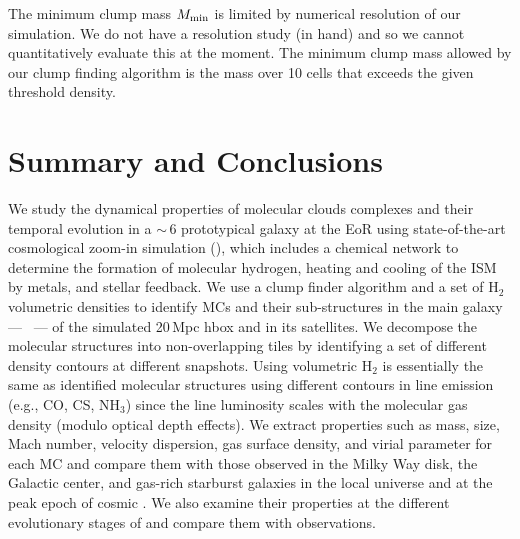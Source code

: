 \documentclass[iop]{emulateapj}
\begin{document}
The minimum clump mass $M_{\rm min}$ is limited by numerical resolution of our simulation. We do not have a resolution study (in hand) and so we cannot quantitatively evaluate this at the moment. The minimum clump mass allowed
by our clump finding algorithm is the mass over 10 cells that exceeds the given threshold density.



\section{Summary and Conclusions}      \label{sec:conclusion}

We study the dynamical properties of molecular clouds complexes and their temporal evolution in a \z$\sim$\,6 prototypical galaxy 
at the EoR using state-of-the-art cosmological zoom-in simulation (),
which includes a chemical network to determine the formation of molecular
hydrogen, heating and cooling of the ISM by metals, and stellar feedback.
We use a clump finder algorithm and a set of H$_2$ volumetric densities
to identify MCs and their sub-structures in the main galaxy --- \flower\ --- of the
simulated 20\,Mpc h\pmOne box and in its satellites.
We decompose the molecular structures into non-overlapping tiles
by identifying a set of different density contours at different snapshots.
Using volumetric H$_2$ is essentially the same as identified molecular structures using
different contours in line emission (e.g., CO, CS, NH$_3$)
since the line luminosity scales with the molecular gas density (modulo optical depth effects).
We extract properties such as mass, size, Mach number, velocity dispersion, gas surface density, and virial parameter for each MC and 
compare them with those observed in the Milky Way disk, the Galactic center,
and gas-rich starburst galaxies in the local universe and at the peak epoch of cosmic \SF.
We also examine their properties at the different evolutionary stages of \flower and compare
them with observations. 
\end{document}
